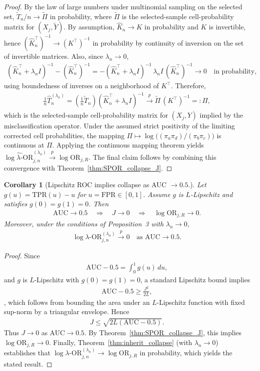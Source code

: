 \documentclass[pdflatex,sn-mathphys-num]{sn-jnl}%
\def\EQSP{3pt}
\newcommand{\cgather}[2][\EQSP]{\begingroup\setlength\abovedisplayskip{#1}\setlength\belowdisplayskip{#1}\begin{gather} #2 \end{gather}\endgroup\noindent}
\theoremstyle{thmstyleone}%
\newtheorem{corollary}[theorem]{Corollary} %
\theoremstyle{thmstyletwo}%
\theoremstyle{thmstylethree}%
\begin{document}
%
\begin{proof}
By the law of large numbers under multinomial sampling on the selected set, $\tilde T_n/n \to \tilde\Pi$ in probability, where
$\tilde\Pi$ is the selected-sample cell-probability matrix for $(X_j,\tilde Y)$.
By assumption, $\hat K_n\to K$ in probability and $K$ is invertible, hence
$(\hat K_n^\top)^{-1}\to (K^\top)^{-1}$ in probability by continuity of inversion on the set of invertible matrices.
Also, since $\lambda_n\to 0$,
\cgather{
(\hat K_n^\top+\lambda_n I)^{-1} - (\hat K_n^\top)^{-1}
= -(\hat K_n^\top+\lambda_n I)^{-1}\,\lambda_n I\,(\hat K_n^\top)^{-1} \to 0
\quad\text{in probability,}
}
using boundedness of inverses on a neighborhood of $K^\top$.
Therefore,
\cgather{
\frac{1}{n}\hat T^{(\lambda_n)}_n
=
\left(\frac{1}{n}\tilde T_n\right)(\hat K_n^\top+\lambda_n I)^{-1} \xrightarrow{p}\tilde\Pi\,(K^\top)^{-1}
=:\Pi,
}
which is the selected-sample cell-probability matrix for $(X_j,Y)$ implied by the misclassification operator.
Under the assumed strict positivity of the limiting corrected cell probabilities, the mapping
$\Pi\mapsto \log\big((\pi_a\pi_d)/(\pi_b\pi_c)\big)$ is continuous at $\Pi$.
Applying the continuous mapping theorem yields
$\widehat{\log\lambda\text{-OR}}_{j,n}^{(\lambda_n)} \xrightarrow{p} \log \mathrm{OR}_{j,R}$.
The final claim follows by combining this convergence with Theorem~\ref{thm:SPOR_collapse_J}.
\end{proof}


\begin{corollary}[Lipschitz ROC implies collapse as AUC $\to 0.5$.]\label{cor:auc_collapse}
Let $g(u)=\mathrm{TPR}(u)-u$ for $u=\mathrm{FPR}\in[0,1]$. 
Assume $g$ is $L$-Lipschitz and satisfies $g(0)=g(1)=0$. 
Then
\cgather{
\mathrm{AUC}\to 0.5 
\quad \Rightarrow \quad 
J \to 0 
\quad \Rightarrow \quad 
\log \mathrm{OR}_{j,R} \to 0.
}
Moreover, under the conditions of Proposition~3 with $\lambda_n\to 0$,
\cgather{
\log\lambda\text{-OR}^{(\lambda_n)}_{j,n}\xrightarrow{p}0
\quad \text{as } \mathrm{AUC}\to 0.5.
}
\end{corollary}
\begin{proof}
Since
\cgather{
\mathrm{AUC}-0.5=\int_0^1 g(u)\,du,
}
and $g$ is $L$-Lipschitz with $g(0)=g(1)=0$, a standard Lipschitz bound implies
\cgather{
\mathrm{AUC}-0.5 \ge \frac{J^2}{2L},
}, which follows from  bounding the area under an $L$-Lipschitz function with fixed sup-norm by a triangular envelope. Hence
\cgather{
J \le \sqrt{2L(\mathrm{AUC}-0.5)}.
}
Thus $J\to 0$ as $\mathrm{AUC}\to 0.5$. 
By Theorem~\ref{thm:SPOR_collapse_J}, this implies $\log \mathrm{OR}_{j,R}\to 0$.
Finally, Theorem~\ref{thm:inherit_collapse} (with $\lambda_n\to 0$) establishes that
$\log\lambda\text{-OR}^{(\lambda_n)}_{j,n}
\to \log \mathrm{OR}_{j,R}$ in probability,
which yields the stated result.
\end{proof}
\end{document}
